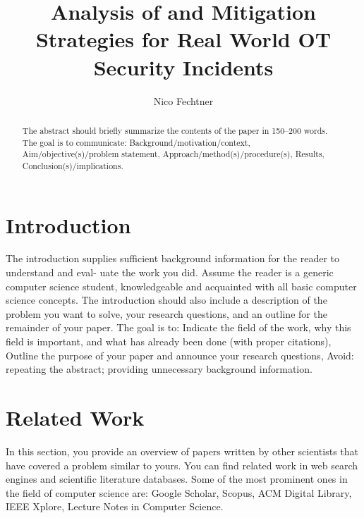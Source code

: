 \documentclass[runningheads]{llncs}
\begin{document}
%
\title{Analysis of and Mitigation Strategies for Real World OT Security Incidents}
%
%
\author{Nico Fechtner}
%
%
%
\maketitle              %
%
\begin{abstract}
The abstract should briefly summarize the contents of the paper in
150--200 words.
The goal is to communicate: Background/motivation/context, Aim/objective(s)/problem statement, Approach/method(s)/procedure(s), Results, Conclusion(s)/implications.

\end{abstract}
%
%
%

\section{Introduction}
The introduction supplies sufficient background information for the reader to understand and eval- uate the work you did. Assume the reader is a generic computer science student, knowledgeable and acquainted with all basic computer science concepts. The introduction should also include a description of the problem you want to solve, your research questions, and an outline for the remainder of your paper. The goal is to: Indicate the field of the work, why this field is important, and what has already been done (with proper citations), Outline the purpose of your paper and announce your research questions, Avoid: repeating the abstract; providing unnecessary background information.
\section{Related Work}
In this section, you provide an overview of papers written by other scientists that have covered a problem similar to yours. You can find related work in web search engines and scientific literature databases. Some of the most prominent ones in the field of computer science are: Google Scholar, Scopus, ACM Digital Library, IEEE Xplore, Lecture Notes in Computer Science.
\end{document}
